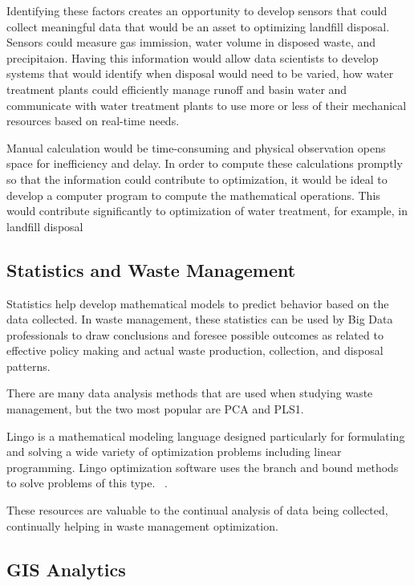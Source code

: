 \documentclass[sigconf]{acmart}
\begin{document}
Identifying these factors creates an opportunity to develop sensors that could collect meaningful data that would be an asset to optimizing landfill disposal.  Sensors could measure gas immission, water volume in disposed waste, and precipitaion.  Having this information would allow data scientists to develop systems that would identify when disposal would need to be varied, how water treatment plants could efficiently manage runoff and basin water and communicate with water treatment plants to use more or less of their mechanical resources based on real-time needs. 

 Manual calculation would be time-consuming and physical observation opens space for inefficiency and delay.  In order to compute these calculations promptly so that the information could contribute to optimization, it would be ideal to develop a computer program to compute the mathematical operations.  This would contribute significantly to optimization of water treatment, for example, in landfill disposal ~\cite{akbarpour2016}


\subsection{Statistics and Waste Management}

Statistics help develop mathematical models to predict behavior based on the data collected.  In waste management, these statistics can be used by Big Data professionals to draw conclusions and foresee possible outcomes as related to effective policy making and actual waste production, collection, and disposal patterns. 

There are many data analysis methods that are used when studying waste management, but the two most popular are PCA and PLS1. 
~\cite{bohm2013}

Lingo is a mathematical modeling language designed particularly for formulating and solving a wide variety of optimization problems including linear programming. Lingo optimization software uses the branch and bound methods to solve problems of this type. ~\cite{akbarpour2016}.  

These resources are valuable to the continual analysis of data being collected, continually helping in waste management optimization.


\subsection{GIS Analytics}
\end{document}

